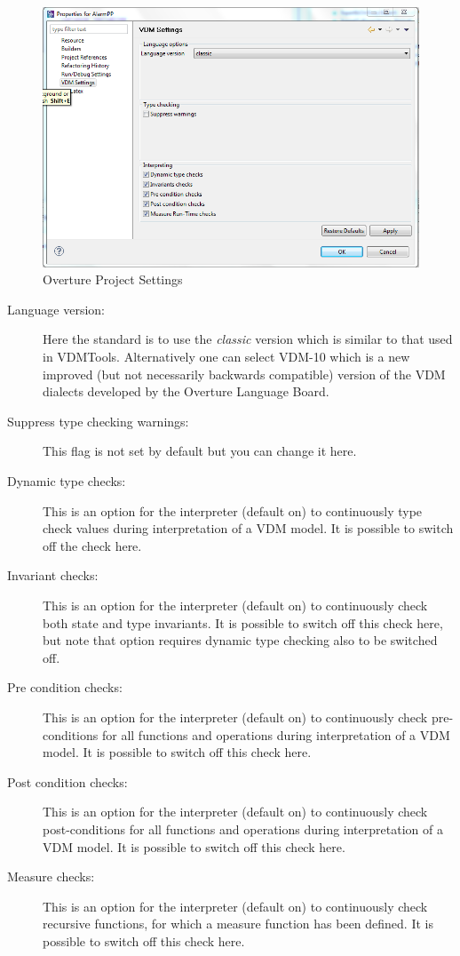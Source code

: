 \documentclass{overturerepchap}
\begin{document}
\begin{figure}[!hbt]
\begin{center}
  \includegraphics[width=\textwidth]{screendumps/projectsettings}
  \caption[Overture Project Settings]{Overture Project Settings}
  \label{fig:VDMSettings}
\end{center}
\end{figure}

\begin{description}
\item[Language version:] Here the standard is to use the
  \emph{classic} version which is similar to that used in
  VDMTools. Alternatively one can select VDM-10 which
  is a new improved (but not necessarily backwards compatible) version of
  the VDM dialects developed by the Overture Language Board. 
\item[Suppress type checking warnings:] This flag is not
  set by default but you can change it here.
\item[Dynamic type checks:] This is an option for the interpreter (default on) 
  to continuously type check  values during interpretation of a VDM model.
  It is possible to switch off the check here.
\item[Invariant checks:] This is an option for the interpreter (default on) 
  to continuously check both state and type invariants.
  It is possible to switch off
  this check here, but note that option requires dynamic type
  checking also to be switched off.
\item[Pre condition checks:] This is an option for the interpreter (default on) 
  to continuously check pre-conditions for all functions and operations
  during interpretation of a VDM model. It is possible to switch off
  this check here.
\item[Post condition checks:] This is an option for the interpreter (default on) 
  to continuously check post-conditions for all functions and operations
  during interpretation of a VDM model. It is possible to switch off
  this check here.
\item[Measure checks:] This is an option for the interpreter (default
  on) to continuously check recursive functions, for which a
  measure function has been defined. It is possible to switch off this
  check here.
\end{description}
\end{document}
